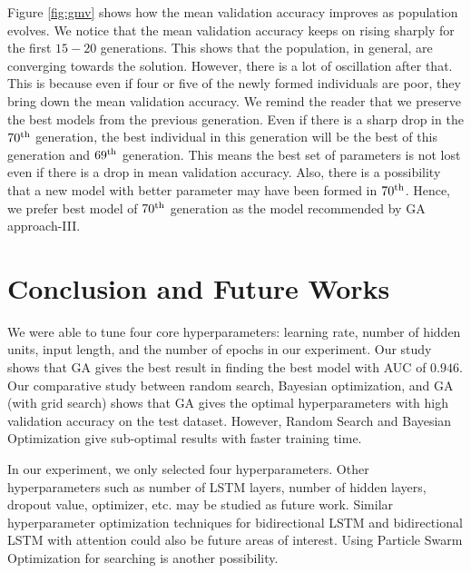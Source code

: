 \documentclass[conference]{IEEEtran}
\begin{document}
Figure \ref{fig:gmv} shows how the mean validation accuracy improves  as population evolves. We notice that the mean validation accuracy keeps on rising sharply for the first $15-20$ generations. This shows that the population, in general, are converging towards the solution. However, there is a lot of oscillation after that. This is because even if four or five of the newly formed individuals are poor, they bring down the mean validation accuracy. We remind the reader that we preserve the best models from the previous generation. Even if there is a sharp drop in the $70\textsuperscript{th}$ generation, the best individual in this generation will be the best of this generation and $69\textsuperscript{th}$ generation. This means the best set of parameters is not lost even if there is a drop in mean validation accuracy. Also, there is a possibility that a new model with better parameter may have been formed in $70\textsuperscript{th}$. Hence, we prefer best model of $70\textsuperscript{th}$ generation as the model recommended by GA approach-III.

\section{Conclusion and Future Works}
We were able to tune four core hyperparameters: learning rate, number of hidden units, input length, and the number of epochs in our experiment. Our study shows that GA gives the best result in finding the best model with AUC of $0.946$. Our comparative study between random search, Bayesian optimization, and GA (with grid search) shows that GA gives the optimal hyperparameters with high validation accuracy on the test dataset. However, Random Search and Bayesian Optimization give sub-optimal results with faster training time.

In our experiment, we only selected four hyperparameters. Other hyperparameters such as number of LSTM layers, number of hidden layers, dropout value, optimizer, etc. may be studied as future work. Similar hyperparameter optimization techniques for bidirectional LSTM and bidirectional LSTM with attention could also be future areas of interest. Using Particle Swarm Optimization for searching is another possibility.
\end{document}
